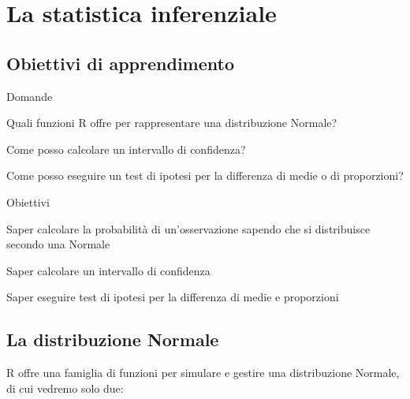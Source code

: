 \chapter{La statistica inferenziale}
\label{cap:inferenziale}

\section*{Obiettivi di apprendimento}


\begin{multicols}{2}
\begin{tcolorbox}[width=1\linewidth, halign=left, colframe=blue!60, colback=white, boxsep=1mm, arc=3mm]

Domande

\begin{myitemize}
	\item Quali funzioni R offre per rappresentare una distribuzione Normale?
	\item Come posso calcolare un intervallo di confidenza?
	\item Come posso eseguire un test di ipotesi per la differenza di medie o di proporzioni?
\end{myitemize}

\end{tcolorbox} 
\columnbreak
\begin{tcolorbox}[width=1\linewidth, halign=left, colframe=blue!60, colback=white, boxsep=1mm, arc=3mm]

Obiettivi

\begin{myitemize}
	\item Saper calcolare la probabilit\`a di un'osservazione sapendo che si distribuisce secondo una Normale
	\item Saper calcolare un intervallo di confidenza
	\item Saper eseguire test di ipotesi per la differenza di medie e proporzioni
\end{myitemize}

\end{tcolorbox} 
\columnbreak
\end{multicols}


\section{La distribuzione Normale}

R offre una famiglia di funzioni per simulare e gestire una distribuzione Normale, di cui vedremo solo due:

